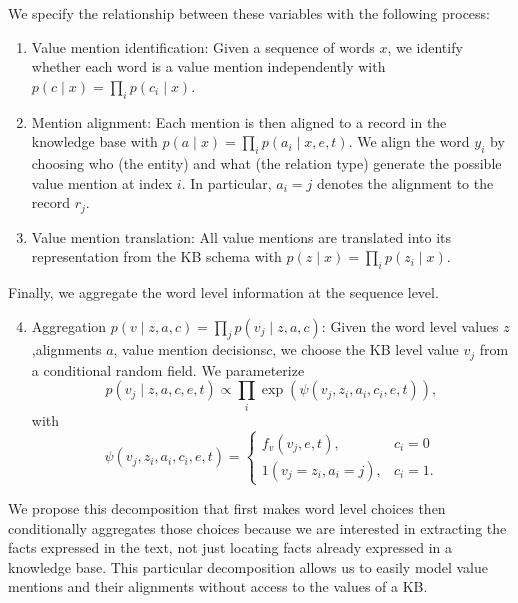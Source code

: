 \documentclass[12pt]{article}
\begin{document}
We specify the relationship between these variables with the following process:
\begin{enumerate}
\item Value mention identification: Given a sequence of words $x$,
    we identify whether each word is a value mention independently with
    $p(c \mid x) = \prod_i p(c_i \mid x)$.
\item Mention alignment: Each mention is then aligned to a 
    record in the knowledge base with $p(a \mid x) = \prod_i p(a_i \mid x,e,t)$.
    We align the word $y_i$ by choosing who (the entity)
    and what (the relation type) generate the possible value mention at index $i$.
    In particular, $a_i = j$ denotes the alignment to the record $r_{j}$.
\item Value mention translation: All value mentions are translated
    into its representation from the KB schema with
    $p(z \mid x) = \prod_i p(z_i \mid x)$.
\end{enumerate}

Finally, we aggregate the word level information at the sequence level.
\begin{enumerate}
\setcounter{enumi}{3}
\item Aggregation $p(v \mid z,a,c) = \prod_j p(v_j \mid z,a,c)$:
    Given the word level values $z$,alignments $a$, value mention decisions$c$,
    we choose the KB level value $v_j$ from a conditional random field.
    We parameterize
    $$p(v_j \mid z,a,c,e,t) \propto \prod_i \exp(\psi(v_j, z_i, a_i, c_i,e,t)),$$
    with
    $$
    \psi(v_j, z_i, a_i, c_i,e,t) = \begin{cases}
    f_v(v_j,e,t), & c_i = 0 \\
    1(v_j = z_i, a_i = j), & c_i = 1.
    \end{cases}
    $$
\end{enumerate}

We propose this decomposition that first makes word level choices
then conditionally aggregates those choices
because we are interested in extracting the facts expressed in the text,
not just locating facts already expressed in a knowledge base.
This particular decomposition allows us to easily model value mentions and their alignments
without access to the values of a KB.
\end{document}
